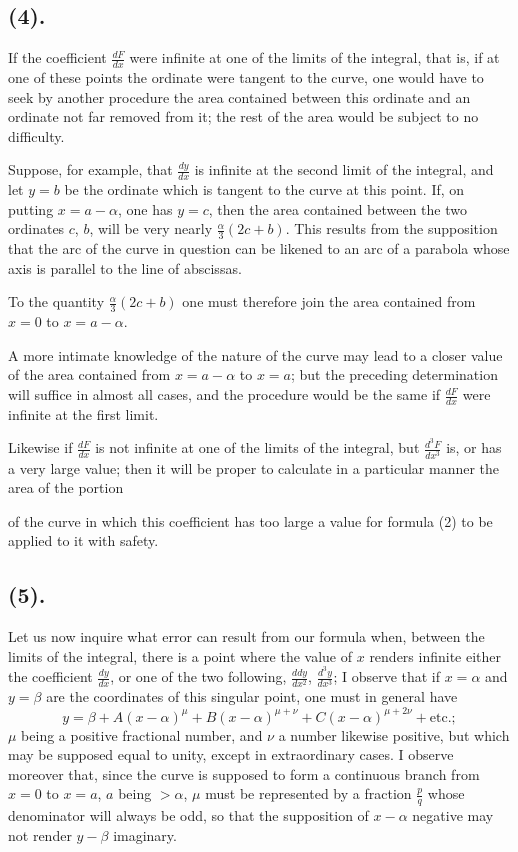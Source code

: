 \documentclass{article}
\begin{document}
\subsection*{(4).}

If the coefficient $\frac{dF}{dx}$ were infinite at one of the limits of the integral, that is, if at one of these points the ordinate were tangent to the curve, one would have to seek by another procedure the area contained between this ordinate and an ordinate not far removed from it; the rest of the area would be subject to no difficulty.

Suppose, for example, that $\frac{dy}{dx}$ is infinite at the second limit of the integral, and let $y=b$ be the ordinate which is tangent to the curve at this point. If, on putting $x=a-\alpha$, one has $y=c$, then the area contained between the two ordinates $c$, $b$, will be very nearly $\frac{\alpha}{3}(2c+b)$. This results from the supposition that the arc of the curve in question can be likened to an arc of a parabola whose axis is parallel to the line of abscissas.

To the quantity $\frac{\alpha}{3}(2c+b)$ one must therefore join the area contained from $x=0$ to $x=a-\alpha$.

A more intimate knowledge of the nature of the curve may lead to a closer value of the area contained from $x=a-\alpha$ to $x=a$; but the preceding determination will suffice in almost all cases, and the procedure would be the same if $\frac{dF}{dx}$ were infinite at the first limit.

Likewise if $\frac{dF}{dx}$ is not infinite at one of the limits of the integral, but $\frac{d^{3}F}{dx^{3}}$ is, or has a very large value; then it will be proper to calculate in a particular manner the area of the portion

of the curve in which this coefficient has too large a value for formula (2) to be applied to it with safety.

\subsection*{(5).}

Let us now inquire what error can result from our formula when, between the limits of the integral, there is a point where the value of $x$ renders infinite either the coefficient $\frac{dy}{dx}$, or one of the two following, $\frac{ddy}{dx^{2}}$, $\frac{d^{3}y}{dx^{3}}$; I observe that if $x=\alpha$ and $y=\beta$ are the coordinates of this singular point, one must in general have
\[ y=\beta+A(x-\alpha)^{\mu}+B(x-\alpha)^{\mu+\nu}+C(x-\alpha)^{\mu+2\nu}+\text{etc.}; \]
$\mu$ being a positive fractional number, and $\nu$ a number likewise positive, but which may be supposed equal to unity, except in extraordinary cases. I observe moreover that, since the curve is supposed to form a continuous branch from $x=0$ to $x=a$, $a$ being $>\alpha$, $\mu$ must be represented by a fraction $\frac{p}{q}$ whose denominator will always be odd, so that the supposition of $x-\alpha$ negative may not render $y-\beta$ imaginary.
\end{document}

